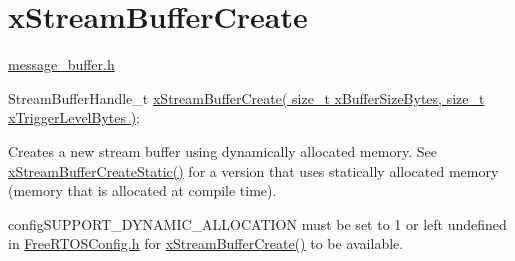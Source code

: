 \hypertarget{group__x_stream_buffer_create}{}\section{x\+Stream\+Buffer\+Create}
\label{group__x_stream_buffer_create}
\hyperlink{message__buffer_8h}{message\+\_\+buffer.\+h}


\begin{DoxyPre}
StreamBufferHandle\_t \hyperlink{stream__buffer_8h_a39aa4dd8b83e2df7ded291f863fb5fed}{xStreamBufferCreate( size\_t xBufferSizeBytes, size\_t xTriggerLevelBytes )};
\end{DoxyPre}


Creates a new stream buffer using dynamically allocated memory. See \hyperlink{stream__buffer_8h_a3c248575ac1b83801db605b32a118f77}{x\+Stream\+Buffer\+Create\+Static()} for a version that uses statically allocated memory (memory that is allocated at compile time).

config\+S\+U\+P\+P\+O\+R\+T\+\_\+\+D\+Y\+N\+A\+M\+I\+C\+\_\+\+A\+L\+L\+O\+C\+A\+T\+I\+ON must be set to 1 or left undefined in \hyperlink{_free_r_t_o_s_config_8h}{Free\+R\+T\+O\+S\+Config.\+h} for \hyperlink{stream__buffer_8h_a39aa4dd8b83e2df7ded291f863fb5fed}{x\+Stream\+Buffer\+Create()} to be available.



